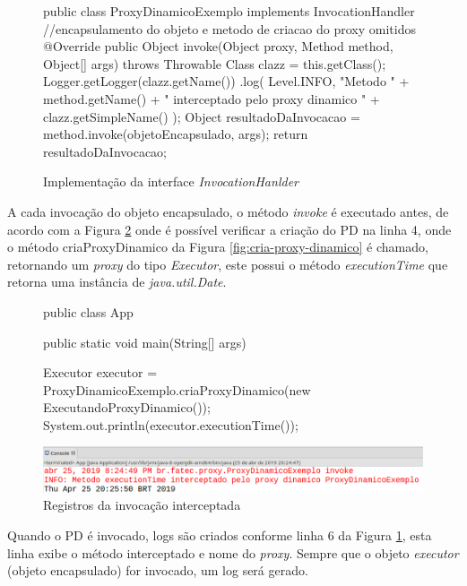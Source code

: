 \begin{figure}[H]
    \centering
    \caption{Implementação da interface \textit{InvocationHanlder}}
\begin{java}
public class ProxyDinamicoExemplo implements InvocationHandler {
//encapsulamento do objeto e metodo de criacao do proxy omitidos
	@Override
	public Object invoke(Object proxy, Method method, Object[] args) throws Throwable {
		Class clazz = this.getClass();
		Logger.getLogger(clazz.getName())
		    .log(
                        Level.INFO, "Metodo " +
                        method.getName() + 
                        " interceptado pelo proxy dinamico " +
                        clazz.getSimpleName()
		    );
		Object resultadoDaInvocacao = method.invoke(objetoEncapsulado, args);
		return resultadoDaInvocacao;
	}
}
\end{java}
    \label{fig:invoke-implementacao}
\end{figure}

\par A cada invocação do objeto encapsulado, o método \textit{invoke} é executado antes, de acordo com a Figura \ref{fig:invoke-registrando-log} onde é possível verificar a criação do PD na linha 4, onde o método criaProxyDinamico da Figura \ref{fig:cria-proxy-dinamico} é chamado, retornando um \textit{proxy} do tipo \textit{Executor}, este possui o método \textit{executionTime} que retorna uma instância de \textit{java.util.Date}.

\begin{figure}[H]
    \centering
    \caption{Registros da invocação interceptada}
    \label{fig:invoke-registrando-log}
    \begin{java}
public class App {
	public static void main(String[] args) {
	
		Executor executor = ProxyDinamicoExemplo.criaProxyDinamico(new ExecutandoProxyDinamico());
		System.out.println(executor.executionTime());
	}
}
    \end{java}
    \includegraphics[scale=0.4]{src/imagens/cap2/invoke-registrando-log.png}
\end{figure}

Quando o PD é invocado, logs são criados conforme linha 6 da Figura \ref{fig:invoke-implementacao}, esta linha exibe o método interceptado e nome do \textit{proxy}. Sempre que o objeto \textit{executor} (objeto encapsulado) for invocado, um log será gerado.

